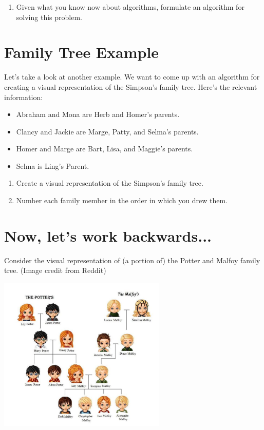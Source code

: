 \documentclass[12pt]{article}
\theoremstyle{definition}
\begin{document}
\begin{enumerate}
	\item Given what you know now about algorithms, formulate an algorithm for solving this problem. 
\end{enumerate}

\section{Family Tree Example}

Let's take a look at another example. We want to come up with an algorithm for creating a visual representation of the Simpson's family tree. Here's the relevant information:
\begin{itemize}
	\item Abraham and Mona are Herb and Homer's parents.
	\item Clancy and Jackie are Marge, Patty, and Selma's parents.
	\item Homer and Marge are Bart, Lisa, and Maggie's parents.
	\item Selma is Ling's Parent.
\end{itemize} 

\begin{enumerate}
	\item Create a visual representation of the Simpson's family tree.
	\vfill
	\item Number each family member in the order in which you drew them.
	\vfill
\end{enumerate}

\newpage
\section{Now, let's work backwards...}

Consider the visual representation of (a portion of) the Potter and Malfoy family tree. (Image credit from Reddit)

\begin{center}
\includegraphics[width=8cm]{potter_family_tree}
\end{center}
\end{document}
